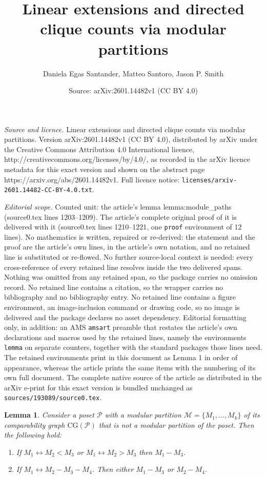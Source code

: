 \documentclass[10pt,a4paper]{amsart}
\title{Linear extensions and directed clique counts via modular partitions}
\author{Daniela Egas Santander, Matteo Santoro, Jason P. Smith}
\date{Source: arXiv:2601.14482v1 (CC BY 4.0)}
\newtheorem{lemma}{Lemma}
\newcommand{\CG}{\mathrm{CG}}
\newcommand{\cM}{\mathcal{M}}
\newcommand{\cP}{\mathcal{P}}
\begin{document}
\maketitle

\noindent\emph{Source and licence.} Linear extensions and directed clique counts via modular partitions. Version arXiv:2601.14482v1 (CC BY 4.0), distributed by arXiv under the Creative Commons Attribution 4.0 International licence, http://creativecommons.org/licenses/by/4.0/, as recorded in the arXiv licence metadata for this exact version and shown on the abstract page https://arxiv.org/abs/2601.14482v1. Full licence notice: \texttt{licenses/arxiv-2601.14482-CC-BY-4.0.txt}.\par\smallskip

\noindent\textit{Editorial scope.} Counted unit: the article's lemma lemma:module\_paths (source0.tex lines 1203--1209). The article's complete original proof of it is delivered with it (source0.tex lines 1210--1221, one \texttt{proof} environment of 12 lines). No mathematics is written, repaired or re-derived: the statement and the proof are the article's own lines, in the article's own notation, and no retained line is substituted or re-flowed.  No further source-local context is needed: every cross-reference of every retained line resolves inside the two delivered spans.  Nothing was omitted from any retained span, so the package carries no omission record.  No retained line contains a citation, so the wrapper carries no bibliography and no bibliography entry.  No retained line contains a figure environment, an image-inclusion command or drawing code, so no image is delivered and the package declares no asset dependency.  Editorial formatting only, in addition: an AMS \texttt{amsart} preamble that restates the article's own declarations and macros used by the retained lines, namely the environments \texttt{lemma} on separate counters, together with the standard packages those lines need.  The retained environments print in this document as Lemma 1 in order of appearance, whereas the article prints the same items with the numbering of its own full document.  The complete native source of the article as distributed in the arXiv e-print for this exact version is bundled unchanged as \texttt{sources/193089/source0.tex}.
\begin{lemma}\label{lemma:module_paths}
Consider a poset $\cP$ with a modular partition $\cM=\{M_1,\ldots,M_k\}$  of its comparability graph $\CG(\cP)$ that is not a modular partition of the poset.  Then the following hold: 
\begin{enumerate}
\item If $M_1 \leftrightarrow M_2 < M_3$ or $M_1 \leftrightarrow M_2 > M_3$ then $M_1-M_3$. 
\item If $M_1 \leftrightarrow M_2 - M_3-M_4$. Then either $M_1 - M_3$ or $M_2 - M_4$.
\end{enumerate}
\end{lemma}
\end{document}
